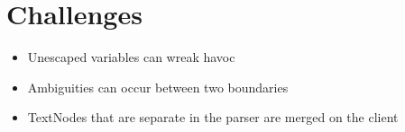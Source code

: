 \section{Challenges}
\begin{itemize}
\item Unescaped variables can wreak havoc
\item Ambiguities can occur between two boundaries
\item TextNodes that are separate in the parser are merged on the client
\end{itemize}
